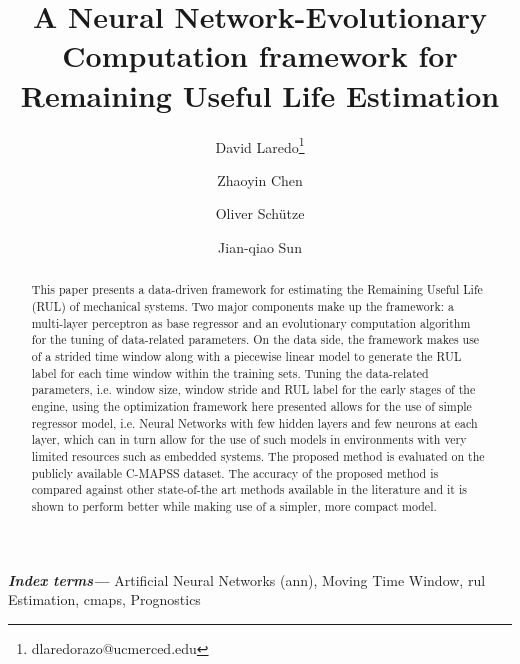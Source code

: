 \documentclass{article}
\title{A Neural Network-Evolutionary Computation framework for Remaining Useful Life Estimation}
\author[1]{David Laredo\thanks{dlaredorazo@ucmerced.edu}}
\author[1]{Zhaoyin Chen}
\author[2]{Oliver Sch\"utze}
\author[1]{Jian-qiao Sun}
\affil[1]{School of Mechanical Engineering, University of California, Merced}
\affil[2]{Department of Computer Science, CINVESTAV, Mexico City, Mexico}
\date{}
\providecommand{\keywords}[1]{\textbf{\textit{Index terms---}} #1}
\begin{document}
\maketitle %

\thispagestyle{fancy} %


\glsunsetall


\begin{abstract}

\noindent 

This paper presents a data-driven framework for estimating the Remaining Useful Life (RUL) of mechanical systems. Two major components make up the framework: a multi-layer perceptron as base regressor and an evolutionary computation algorithm for the tuning of data-related parameters. On the data side, the framework makes use of a strided time window along with a piecewise linear model to generate the RUL label for each time window within the training sets. Tuning the data-related parameters, i.e. window size, window stride and RUL label for the early stages of the engine, using the optimization framework here presented allows for the use of simple regressor model, i.e. Neural Networks with few hidden layers and few neurons at each layer, which can in turn allow for the use of such models in environments with very limited resources such as embedded systems. The proposed method is evaluated on the publicly available C-MAPSS dataset. The accuracy of the proposed method is compared against other state-of-the art methods available in the literature and it is shown to perform better while making use of a simpler, more compact model.
\end{abstract}

\keywords{Artificial Neural Networks (\gls{ann}), Moving Time Window, \gls{rul} Estimation, \gls{cmaps}, Prognostics}




%
%



%







\end{document}
